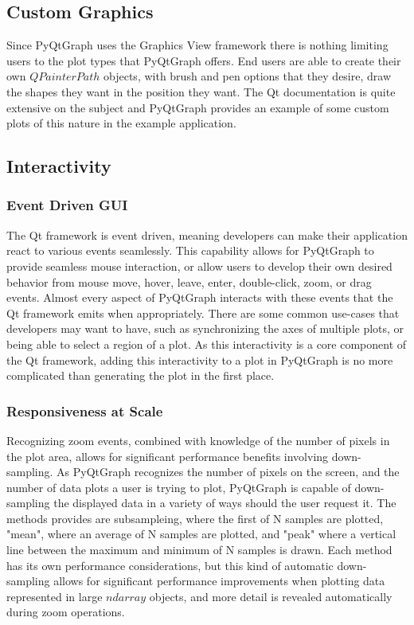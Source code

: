 \documentclass[journal]{vgtc}                %
\begin{document}
\subsection{Custom Graphics}

Since PyQtGraph uses the Graphics View framework there is nothing limiting users to the plot types that PyQtGraph offers.  End users are able to create their own $QPainterPath$ objects, with brush and pen options that they desire, draw the shapes they want in the position they want.  The Qt documentation is quite extensive on the subject and PyQtGraph provides an example of some custom plots of this nature in the example application.

\subsection{Interactivity}
\subsubsection{Event Driven GUI}

The Qt framework is event driven, meaning developers can make their application react to various events seamlessly.  This capability allows for PyQtGraph to provide seamless mouse interaction, or allow users to develop their own desired behavior from mouse move, hover, leave, enter, double-click, zoom, or drag events.  Almost every aspect of PyQtGraph interacts with these events that the Qt framework emits when appropriately.  There are some common use-cases that developers may want to have, such as synchronizing the axes of multiple plots, or being able to select a region of a plot.  As this interactivity is a core component of the Qt framework, adding this interactivity to a plot in PyQtGraph is no more complicated than generating the plot in the first place.

\subsubsection{Responsiveness at Scale} %

Recognizing zoom events, combined with knowledge of the number of pixels in the plot area, allows for significant performance benefits involving down-sampling.  As PyQtGraph recognizes the number of pixels on the screen, and the number of data plots a user is trying to plot, PyQtGraph is capable of down-sampling the displayed data in a variety of ways should the user request it.  The methods provides are subsampleing, where the first of N samples are plotted, "mean", where an average of N samples are plotted, and "peak" where a vertical line between the maximum and minimum of N samples is drawn.  Each method has its own performance considerations, but this kind of automatic down-sampling allows for significant performance improvements when plotting data represented in large $ndarray$ objects, and more detail is revealed automatically during zoom operations.
\end{document}
